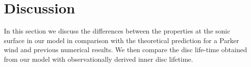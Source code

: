 \documentclass[usenatbib,useAMS,usedcolumn]{mnras}
\begin{document}






\section{Discussion}\label{sec:discussion}

In this section we discuss the differences between the properties at the sonic surface in our model in comparison with the theoretical prediction for a Parker wind and previous numerical results. We then compare the disc life-time obtained from our model with observationally derived inner disc lifetime.
\end{document}
